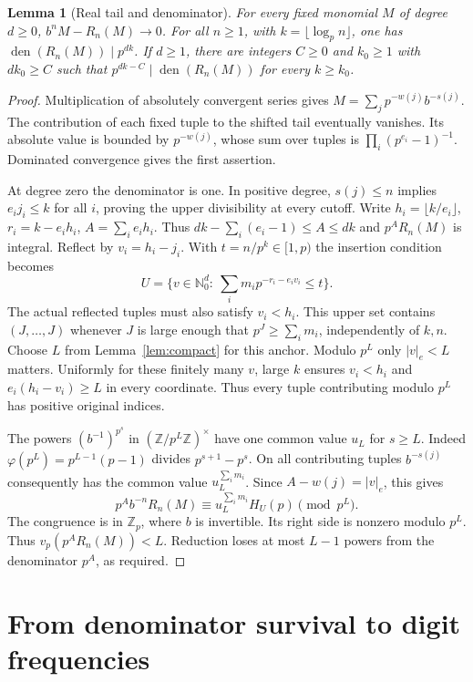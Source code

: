 \documentclass[11pt]{article}
\newtheorem{lemma}[theorem]{Lemma}
\newcommand{\Z}{\mathbb Z}
\newcommand{\N}{\mathbb N_0}
\DeclareMathOperator{\den}{den}
\begin{document}
\begin{lemma}[Real tail and denominator]\label{lem:den}
For every fixed monomial $M$ of degree $d\ge0$, $b^nM-R_n(M)\to0$.
For all $n\ge1$, with $k=\lfloor\log_p n\rfloor$, one has $\den(R_n(M))\mid p^{dk}$.
If $d\ge1$, there are integers $C\ge0$ and $k_0\ge1$ with $dk_0\ge C$ such that
$p^{dk-C}\mid\den(R_n(M))$ for every $k\ge k_0$.
\end{lemma}
\begin{proof}
Multiplication of absolutely convergent series gives
$M=\sum_j p^{-w(j)}b^{-s(j)}$. The contribution of each fixed tuple to the shifted
tail eventually vanishes. Its absolute value is bounded by $p^{-w(j)}$, whose sum
over tuples is $\prod_i(p^{e_i}-1)^{-1}$. Dominated convergence gives the first assertion.

At degree zero the denominator is one. In positive degree, $s(j)\le n$ implies
$e_i j_i\le k$ for all $i$, proving the upper divisibility at every cutoff. Write
$h_i=\lfloor k/e_i\rfloor$, $r_i=k-e_i h_i$, $A=\sum_i e_i h_i$.
Thus $dk-\sum_i(e_i-1)\le A\le dk$ and $p^A R_n(M)$ is integral.
Reflect by $v_i=h_i-j_i$. With $t=n/p^k\in[1,p)$ the insertion condition becomes
\[
 U=\Big\{v\in\N^d:\ \sum_i m_i p^{-r_i-e_i v_i}\le t\Big\}.
\]
The actual reflected tuples must also satisfy $v_i<h_i$. This upper set contains
$(J,\ldots,J)$ whenever $J$ is large enough that $p^J\ge\sum_i m_i$, independently
of $k,n$. Choose $L$ from Lemma~\ref{lem:compact} for this anchor. Modulo $p^L$ only
$|v|_e<L$ matters. Uniformly for these finitely many $v$, large $k$ ensures
$v_i<h_i$ and $e_i(h_i-v_i)\ge L$ in every coordinate. Thus every tuple contributing modulo $p^L$ has positive original indices.

The powers $(b^{-1})^{p^s}$ in $(\Z/p^L\Z)^\times$ have one common value $u_L$
for $s\ge L$. Indeed $\varphi(p^L)=p^{L-1}(p-1)$ divides
$p^{s+1}-p^s$. On all contributing tuples $b^{-s(j)}$ consequently has the
common value $u_L^{\sum_i m_i}$. Since $A-w(j)=|v|_e$, this gives
\begin{equation}\label{eq:frozen}
 p^A b^{-n}R_n(M)\equiv u_L^{\sum_i m_i} H_U(p)\pmod {p^L}.
\end{equation}
The congruence is in $\Z_p$, where $b$ is invertible. Its right side is nonzero
modulo $p^L$. Thus $v_p(p^A R_n(M))<L$. Reduction loses at most $L-1$ powers
from the denominator $p^A$, as required.
\end{proof}

\section{From denominator survival to digit frequencies}
\end{document}
